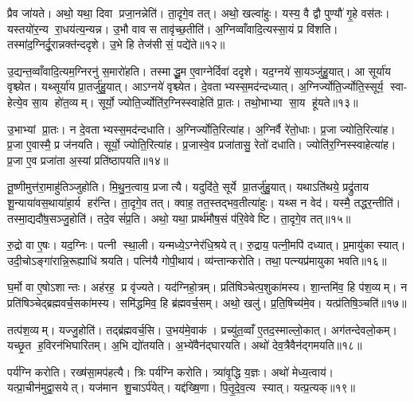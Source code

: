 प्रैव जा॑यते। अथो॒ यथा॒ दिवा प्रजा॒नन्नेति॑। ता॒दृगे॒व तत्। अथो॒ खल्वा॑हुः। यस्य॒ वै द्वौ पुण्यौ॑ गृ॒हे वस॑तः। यस्तयो॑र॒न्य रा॒धय॑त्य॒न्यन्न। उ॒भौ वाव स तावृ॑च्छ॒तीति॑। अ॒ग्निव्वाँवादि॒त्यस्सा॒यं प्र वि॑शति। तस्मा॑द॒ग्निर्दू॒रान्नक्त॑न्ददृशे। उ॒भे हि तेज॑सी सं॒ पद्ये॑ते॥१२॥

उ॒द्यन्त॒व्वाँवादि॒त्यम॒ग्निरनु॑ स॒मारो॑हति। तस्माद्धू॒म ए॒वाग्नेर्दिवा॑ ददृशे। यद॒ग्नये॑ सा॒यञ्जु॑हु॒यात्। आ सूर्या॑य वृश्च्येत। यथ्सूर्या॑य प्रा॒तर्जु॑हु॒यात्। आऽग्नये॑ वृश्च्येत। दे॒वताभ्यस्स॒मद॑न्दध्यात्। अ॒ग्निर्ज्योति॒र्ज्योति॒स्सूर्य॒ स्वा- हेत्ये॒व सा॒य हो॑त॒व्यम्। सूर्यो॒ ज्योति॒र्ज्योति॑र॒ग्निस्स्वाहेति॑ प्रा॒तः। तथो॒भाभ्या सा॒य हू॑यते॥१३॥

उ॒भाभ्यां प्रा॒तः। न दे॒वताभ्यस्स॒मद॑न्दधाति। अ॒ग्निर्ज्योति॒रित्या॑ह। अ॒ग्निर्वै रे॑तो॒धाः। प्र॒जा ज्योति॒रित्या॑ह। प्र॒जा ए॒वास्मै॒ प्र ज॑नयति। सूर्यो॒ ज्योति॒रित्या॑ह। प्र॒जास्वे॒व प्रजा॑तासु॒ रेतो॑ दधाति। ज्योति॑र॒ग्निस्स्वाहेत्या॑ह। प्र॒जा ए॒व प्रजा॑ता अ॒स्यां प्रति॑ष्ठापयति॥१४॥

तू॒ष्णीमुत्त॑रा॒माहु॑तिञ्जुहोति। मि॒थु॒न॒त्वाय॒ प्रजात्यै। यदुदि॑ते॒ सूर्ये प्रा॒तर्जु॑हु॒यात्। यथाऽति॑थये॒ प्रद्रु॑ताय शू॒न्याया॑वस॒थाया॑हा॒र्य हर॑न्ति। ता॒दृगे॒व तत्। क्वाह॒ तत॒स्तद्भव॒तीत्या॑हुः। यथ्स न वेद॑। यस्मै॒ तद्धर॒न्तीति॑। तस्मा॒द्यदौ॑ष॒सञ्जु॒होति॑। तदे॒व सं॑प्र॒ति। अथो॒ यथा॒ प्रार्थ॑मौष॒सं प॑रि॒वेवेष्टि। ता॒दृगे॒व तत्॥१५॥\anuvakamend[अ॒मृ॒ष्ट॒ वि॒चि॒किथ्स॑ति॒ जुह्व॑त्य॒जाम॑सृजताग्निहो॒त्र सूर्या॑य प्रा॒तर्जु॒होति॒ जुह्व॑ति सं॒पद्ये॑ते हूयते स्थापयति संप्र॒ति द्वे च॑]

रु॒द्रो वा ए॒षः। यद॒ग्निः। पत्नी स्था॒ली। यन्मध्ये॒ऽग्नेर॑धि॒श्रयेत्। रु॒द्राय॒ पत्नी॒मपि॑ दध्यात्। प्र॒मायु॑का स्यात्। उदी॒चोऽङ्गा॑रान्नि॒रूह्याधि॑ श्रयति। पत्नि॑यै गोपी॒थाय॑। व्य॑न्तान्करोति। तथा॒ पत्न्यप्र॑मायुका भवति॥१६॥

घ॒र्मो वा ए॒षोऽशान्तः। अह॑रह॒ प्र वृ॑ज्यते। यद॑ग्निहो॒त्रम्। प्रति॑षिञ्चेत्प॒शुका॑मस्य। शा॒न्तमि॑व॒ हि प॑श॒व्यम्। न प्रति॑षिञ्चेद्ब्रह्मवर्च॒सका॑मस्य। समि॑द्धमिव॒ हि ब्र॑ह्मवर्च॒सम्। अथो॒ खलु॑। प्र॒ति॒षिच्य॑मे॒व। यत्प्र॑तिषि॒ञ्चति॑॥१७॥

तत्प॑श॒व्यम्। यज्जु॒होति॑। तद्ब्र॑ह्मवर्च॒सि। उ॒भय॑मे॒वाक॑। प्रच्यु॑त॒व्वाँ ए॒तद॒स्माल्लो॒कात्। अग॑तन्देवलो॒कम्। यच्छृ॒त ह॒विरन॑भिघारितम्। अ॒भि द्यो॑तयति। अ॒भ्ये॑वैन॑द्घारयति। अथो॑ देव॒त्रैवैन॑द्गमयति॥१८॥

पर्य॑ग्नि करोति। रख्ष॑सा॒मप॑हत्यै। त्रिः पर्य॑ग्नि करोति। त्र्या॑वृ॒द्धि य॒ज्ञः। अथो॑ मेध्य॒त्वाय॑। यत्प्रा॒चीन॑मुद्वा॒सयेत्। यज॑मान शु॒चाऽर्प॑येत्। यद्द॑ख्षि॒णा। पि॒तृ॒दे॒व॒त्य स्यात्। यत्प्र॒त्यक्॥१९॥


